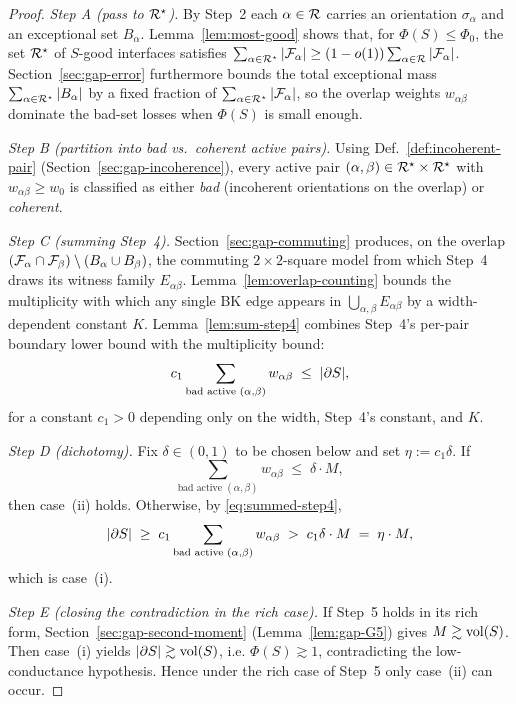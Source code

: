 \begin{proof}
\emph{Step A (pass to $\mathcal{R}^\star$).}
By Step~2 each $\alpha\in\mathcal{R}$ carries an orientation $\sigma_\alpha$
and an exceptional set $B_\alpha$.
Lemma~\ref{lem:most-good} shows that, for $\Phi(S)\le\Phi_0$,
the set $\mathcal{R}^\star$ of $S$-good interfaces satisfies
$\sum_{\alpha\in\mathcal{R}^\star}|\mathcal{F}_{\alpha}|\ge(1-o(1))
\sum_{\alpha\in\mathcal{R}}|\mathcal{F}_{\alpha}|$.
Section~\ref{sec:gap-error} furthermore bounds the total
exceptional mass $\sum_{\alpha\in\mathcal{R}^\star}|B_\alpha|$ by a fixed
fraction of $\sum_{\alpha\in\mathcal{R}^\star}|\mathcal{F}_{\alpha}|$, so the
overlap weights $w_{\alpha\beta}$ dominate the bad-set losses when
$\Phi(S)$ is small enough.

\emph{Step B (partition into bad vs.\ coherent active pairs).}
Using Def.~\ref{def:incoherent-pair}
(Section~\ref{sec:gap-incoherence}), every active pair
$(\alpha,\beta)\in\mathcal{R}^\star\times\mathcal{R}^\star$ with
$w_{\alpha\beta}\ge w_0$ is classified as either \emph{bad} (incoherent
orientations on the overlap) or \emph{coherent}.

\emph{Step C (summing Step~4).}
Section~\ref{sec:gap-commuting} produces, on the overlap
$(\mathcal{F}_{\alpha}\cap\mathcal{F}_{\beta})\setminus(B_\alpha\cup B_\beta)$,
the commuting $2\times 2$-square model from which Step~4 draws its
witness family $E_{\alpha\beta}$.
Lemma~\ref{lem:overlap-counting} bounds the multiplicity with
which any single BK edge appears in $\bigcup_{\alpha,\beta}E_{\alpha\beta}$
by a width-dependent constant $K$.
Lemma~\ref{lem:sum-step4} combines Step~4's per-pair boundary
lower bound with the multiplicity bound:
\begin{equation}\label{eq:summed-step4}
c_1\sum_{\text{bad active }(\alpha,\beta)} w_{\alpha\beta}
\;\le\; |\partial S|,
\end{equation}
for a constant $c_1>0$ depending only on the width, Step~4's constant,
and $K$.

\emph{Step D (dichotomy).}
Fix $\delta\in(0,1)$ to be chosen below and set $\eta:=c_1\delta$.
If
\[
\sum_{\text{bad active }(\alpha,\beta)} w_{\alpha\beta}
\;\le\;\delta\cdot M,
\]
then case~(ii) holds.
Otherwise, by \eqref{eq:summed-step4},
\[
|\partial S|
 \;\ge\; c_1\sum_{\text{bad active }(\alpha,\beta)} w_{\alpha\beta}
 \;>\; c_1\delta\cdot M \;=\; \eta\cdot M,
\]
which is case~(i).

\emph{Step E (closing the contradiction in the rich case).}
If Step~5 holds in its rich form, Section~\ref{sec:gap-second-moment}
(Lemma~\ref{lem:gap-G5}) gives $M \gtrsim\operatorname{vol}(S)$.
Then case~(i) yields $|\partial S|\gtrsim\operatorname{vol}(S)$, i.e.
$\Phi(S)\gtrsim 1$, contradicting the low-conductance hypothesis.
Hence under the rich case of Step~5 only case~(ii) can occur.
\end{proof}

